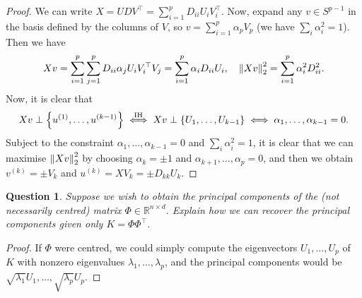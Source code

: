 \documentclass{article}
\theoremstyle{plain}
\newtheorem{question}{Question}
\theoremstyle{remark}
\newcommand{\Bb}{\mathbb}
\newcommand{\Rm}{\mathrm}
\newcommand{\RR}{\Bb R}
\newcommand{\T}{^\top} %
\begin{document}
\begin{proof}
	We can write $X = UDV\T = \sum_{i=1}^p D_{ii} U_i V_i\T$. Now, expand any $v \in S^{p-1}$ in the basis defined by the columns of $V$, so $v = \sum_{i=1}^p \alpha_p V_p$ (we have $\sum_i \alpha_i^2 =1$). Then we have
	\[
	Xv = \sum_{i=1}^p \sum_{j=1}^p D_{ii} \alpha_j U_i V_i\T V_j = \sum_{i=1}^p \alpha_i D_{ii} U_i, \quad \norm{Xv}_2^2 = \sum_{i=1}^p \alpha_i^2 D_{ii}^2. 
	\]
	Now, it is clear that \[Xv \perp \qty{u^{(1)}, \dotsc, u^{(k-1)}} \overset{\Rm{IH}}{\iff} Xv \perp \qty{U_1, \dotsc, U_{k-1}} \iff \alpha_1, \dotsc, \alpha_{k-1} = 0. 
	\]
	Subject to the constraint $\alpha_1, \dotsc, \alpha_{k-1} = 0$ and $\sum_i \alpha_i^2 = 1$, it is clear that we can maximise $\norm{Xv}_2^2$ by choosing $\alpha_k = \pm 1$ and $\alpha_{k+1},\dotsc, \alpha_p = 0$, and then we obtain $v^{(k)} = \pm V_k$ and $u^{(k)} = XV_k = \pm D_{kk} U_k$. 
\end{proof}

\begin{question}
	Suppose we wish to obtain the principal components of the (not necessarily centred) matrix $\Phi \in \RR^{n\times d}$. Explain how we can recover the principal components given only $K = \Phi\Phi\T$. 
\end{question}

\begin{proof}
	If $\Phi$ were centred, we could simply compute the eigenvectors $U_1, \dotsc, U_p$ of $K$ with nonzero eigenvalues $\lambda_1,\dotsc, \lambda_p$, and the principal components would be $\sqrt{\lambda_1} U_1, \dotsc, \sqrt{\lambda_p} U_p$. 
\end{proof}
\end{document}
